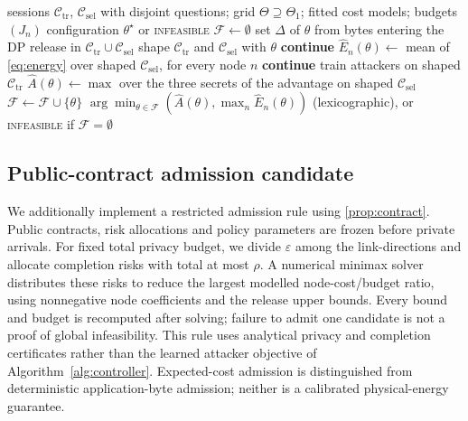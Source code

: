 \begin{algorithm}[t]
\caption{Green Shaping configuration selection}\label{alg:controller}
\footnotesize
\begin{algorithmic}[1]
\Require sessions $\mathcal{C}_{\mathrm{tr}}$, $\mathcal{C}_{\mathrm{sel}}$ with disjoint questions; grid $\Theta\supseteq\Theta_1$; fitted cost models; budgets $(J_n)$
\Ensure configuration $\theta^\star$ or \textsc{infeasible}
\State $\mathcal{F}\gets\emptyset$
\For{$\theta\in\Theta$}
  \State set $\Delta$ of $\theta$ from bytes entering the DP release in $\mathcal{C}_{\mathrm{tr}}\cup\mathcal{C}_{\mathrm{sel}}$
  \State shape $\mathcal{C}_{\mathrm{tr}}$ and $\mathcal{C}_{\mathrm{sel}}$ with $\theta$
   \textbf{continue} \EndIf
  \State $\hat E_n(\theta)\gets$ mean of \cref{eq:energy} over shaped $\mathcal{C}_{\mathrm{sel}}$, for every node $n$
   \textbf{continue} \EndIf
  \State train attackers on shaped $\mathcal{C}_{\mathrm{tr}}$
  \State $\hat A(\theta)\gets\max$ over the three secrets of the advantage on shaped $\mathcal{C}_{\mathrm{sel}}$
  \State $\mathcal{F}\gets\mathcal{F}\cup\{\theta\}$
\EndFor
\State \Return $\arg\min_{\theta\in\mathcal{F}}(\hat A(\theta),\max_n \hat E_n(\theta))$ (lexicographic), or \textsc{infeasible} if $\mathcal{F}=\emptyset$
\end{algorithmic}
\end{algorithm}

\subsection{Public-contract admission candidate}\label{sec:admission}
We additionally implement a restricted admission rule using \cref{prop:contract}. Public contracts, risk allocations and policy parameters are frozen before private arrivals. For fixed total privacy budget, we divide $\varepsilon$ among the link-directions and allocate completion risks with total at most $\rho$. A numerical minimax solver distributes these risks to reduce the largest modelled node-cost/budget ratio, using nonnegative node coefficients and the release upper bounds. Every bound and budget is recomputed after solving; failure to admit one candidate is not a proof of global infeasibility. This rule uses analytical privacy and completion certificates rather than the learned attacker objective of Algorithm~\ref{alg:controller}. Expected-cost admission is distinguished from deterministic application-byte admission; neither is a calibrated physical-energy guarantee.

